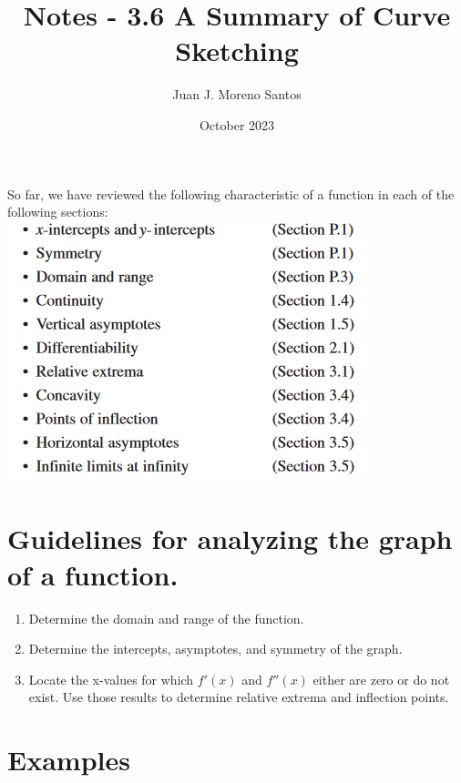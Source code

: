 \documentclass[11pt]{article}
\title{Notes - 3.6 A Summary of Curve Sketching}
\author{Juan J. Moreno Santos}
\date{October 2023}
\begin{document}
\maketitle

So far, we have reviewed the following characteristic of a function in each of the following sections:\\
\includegraphics{1.png}\\

\section{Guidelines for analyzing the graph of a function.}
\begin{enumerate}
    \item Determine the domain and range of the function.
    \item Determine the intercepts, asymptotes, and symmetry of the graph.
    \item Locate the x-values for which $f'(x)$ and $f''(x)$ either are zero or do not exist. Use those results to determine relative extrema and inflection points.
\end{enumerate}

\section{Examples}
\end{document}
